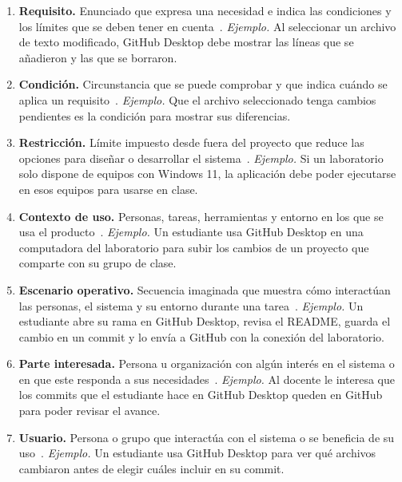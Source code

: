 \documentclass[11pt,a4paper]{article}
\begin{document}
\begin{enumerate}
  \setlength{\itemsep}{2pt}
  \item \textbf{Requisito.} Enunciado que expresa una necesidad e indica las
  condiciones y los límites que se deben tener en cuenta~\cite[Sec.
  3.1.19]{iso29148}. \textit{Ejemplo.} Al seleccionar un archivo de texto
  modificado, GitHub Desktop debe mostrar las líneas que se añadieron y las
  que se borraron.

  \item \textbf{Condición.} Circunstancia que se puede comprobar y que indica
  cuándo se aplica un requisito~\cite[Sec. 3.1.6]{iso29148}. \textit{Ejemplo.}
  Que el archivo seleccionado tenga cambios pendientes es la condición para
  mostrar sus diferencias.

  \item \textbf{Restricción.} Límite impuesto desde fuera del proyecto que
  reduce las opciones para diseñar o desarrollar el sistema~\cite[Sec.
  3.1.7]{iso29148}. \textit{Ejemplo.} Si un laboratorio solo dispone de
  equipos con Windows 11, la aplicación debe poder ejecutarse en esos equipos
  para usarse en clase.

  \item \textbf{Contexto de uso.} Personas, tareas, herramientas y entorno en
  los que se usa el producto~\cite[Sec. 3.1.8]{iso29148}. \textit{Ejemplo.} Un
  estudiante usa GitHub Desktop en una computadora del laboratorio para subir
  los cambios de un proyecto que comparte con su grupo de clase.

  \item \textbf{Escenario operativo.} Secuencia imaginada que muestra cómo
  interactúan las personas, el sistema y su entorno durante una
  tarea~\cite[Sec. 3.1.17]{iso29148}. \textit{Ejemplo.} Un estudiante abre su
  rama en GitHub Desktop, revisa el README, guarda el cambio en un commit y lo
  envía a GitHub con la conexión del laboratorio.

  \item \textbf{Parte interesada.} Persona u organización con algún interés en
  el sistema o en que este responda a sus necesidades~\cite[Sec.
  3.1.28]{iso29148}. \textit{Ejemplo.} Al docente le interesa que los commits
  que el estudiante hace en GitHub Desktop queden en GitHub para poder revisar
  el avance.

  \item \textbf{Usuario.} Persona o grupo que interactúa con el sistema o se
  beneficia de su uso~\cite[Sec. 3.1.35]{iso29148}. \textit{Ejemplo.} Un
  estudiante usa GitHub Desktop para ver qué archivos cambiaron antes de
  elegir cuáles incluir en su commit.


\end{enumerate}
\end{document}
